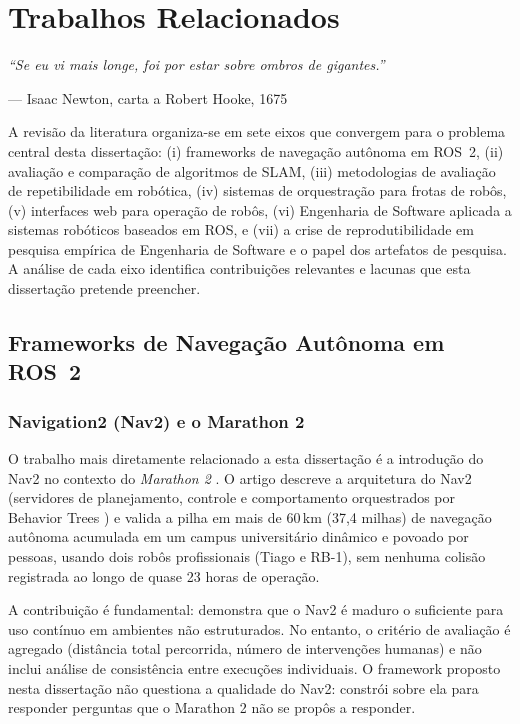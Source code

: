 \chapter{Trabalhos Relacionados}
\label{chap:relacionados}

\epigraph{\itshape ``Se eu vi mais longe, foi por estar sobre ombros de gigantes.''}
{\normalfont --- Isaac Newton, carta a Robert Hooke, 1675}

A revisão da literatura organiza-se em sete eixos que convergem para o problema
central desta dissertação: (i) frameworks de navegação autônoma em ROS~2, (ii)
avaliação e comparação de algoritmos de SLAM, (iii) metodologias de avaliação
de repetibilidade em robótica, (iv) sistemas de orquestração para frotas de
robôs, (v) interfaces web para operação de robôs, (vi) Engenharia de Software
aplicada a sistemas robóticos baseados em ROS, e (vii) a crise de reprodutibilidade
em pesquisa empírica de Engenharia de Software e o papel dos artefatos de pesquisa.
A análise de cada eixo identifica contribuições relevantes e lacunas que esta
dissertação pretende preencher.

\section{Frameworks de Navegação Autônoma em ROS~2}
\label{sec:rel_nav}

\subsection{Navigation2 (Nav2) e o Marathon 2}

O trabalho mais diretamente relacionado a esta dissertação é a introdução do
Nav2 no contexto do \textit{Marathon 2} \cite{macenski2020marathon}. O artigo
descreve a arquitetura do Nav2 (servidores de planejamento, controle e
comportamento orquestrados por Behavior Trees \cite{colledanchise2018}) e valida a pilha em mais de
60\,km (37,4 milhas) de navegação autônoma acumulada em um campus universitário
dinâmico e povoado por pessoas, usando dois robôs profissionais (Tiago e RB-1),
sem nenhuma colisão registrada ao longo de quase 23 horas de operação.

A contribuição é fundamental: demonstra que o Nav2 é maduro o suficiente para
uso contínuo em ambientes não estruturados. No entanto, o critério de avaliação
é agregado (distância total percorrida, número de intervenções humanas) e não
inclui análise de consistência entre execuções individuais. O framework proposto
nesta dissertação não questiona a qualidade do Nav2: constrói sobre ela para
responder perguntas que o Marathon 2 não se propôs a responder.

